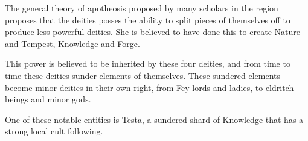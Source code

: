 The general theory of apotheosis proposed by many scholars in the region proposes that the deities posses the ability to split pieces of themselves off to produce less powerful deities.
She is believed to have done this to create Nature and Tempest, Knowledge and Forge.

This power is believed to be inherited by these four deities, and from time to time these deities sunder elements of themselves.
These sundered elements become minor deities in their own right, from Fey lords and ladies, to eldritch beings and minor gods.

One of these notable entities is Testa, a sundered shard of Knowledge that has a strong local cult following.
